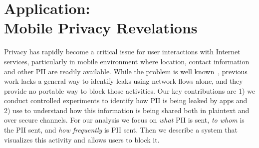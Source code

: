 \section{Application: \\
Mobile Privacy Revelations}
\label{sec:characterize-app}
%
%
Privacy has rapidly become a critical issue for user interactions with Internet services, particularly in 
mobile environment where location, contact information and other PII are readily available. While the problem 
is well known~\cite{roesner:webtrackers,leontiadis:mobileads,vallina-rod:ads}, previous work lacks a general 
way to identify leaks using network flows alone, and they provide no portable way to block those 
activities. Our key 
contributions are 1) we conduct controlled experiments to identify how PII is being leaked by apps  
 and 2) use \platname{} to understand how this information is being shared both in plaintext and over 
secure channels. 
For our analysis we focus on {\it what} PII is sent,  {\it to whom} is the PII sent, and {\it how frequently} is PII sent.
Then we describe a system that visualizes 
this activity and allows users to block it.


